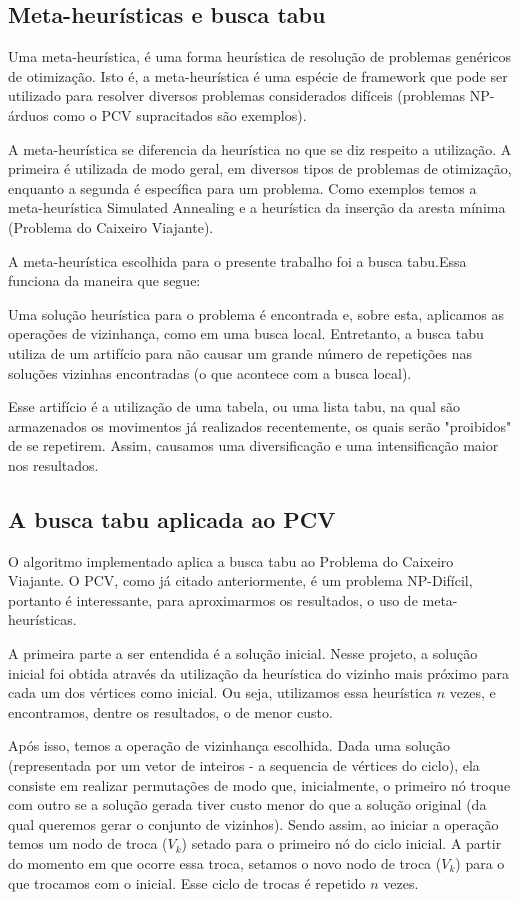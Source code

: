 \subsection{Meta-heurísticas e busca tabu}
Uma meta-heurística, é uma forma heurística de resolução de problemas genéricos de otimização\cite{metaheuristicas2009}. Isto é, a meta-heurística é uma espécie de framework que pode ser utilizado para resolver diversos problemas considerados difíceis (problemas NP-árduos como o PCV supracitados são exemplos).

A meta-heurística se diferencia da heurística no que se diz respeito a utilização. A primeira é utilizada de modo geral, em diversos tipos de problemas de otimização, enquanto a segunda é específica para um problema. Como exemplos temos a meta-heurística Simulated Annealing e a heurística da inserção da aresta mínima (Problema do Caixeiro Viajante).

A meta-heurística escolhida para o presente trabalho foi a busca tabu.Essa funciona da maneira que segue:

Uma solução heurística para o problema é encontrada e, sobre esta, aplicamos as operações de vizinhança, como em uma busca local. Entretanto, a busca tabu utiliza de um artifício para não causar um grande número de repetições nas soluções vizinhas encontradas (o que acontece com a busca local).

Esse artifício é a utilização de uma tabela, ou uma lista tabu, na qual são armazenados os movimentos já realizados recentemente, os quais serão "proibidos" de se repetirem. Assim, causamos uma diversificação e uma intensificação maior nos resultados.

\subsection{A busca tabu aplicada ao PCV}


O algoritmo implementado aplica a busca tabu ao Problema do Caixeiro Viajante. O PCV, como já citado anteriormente, é um problema NP-Difícil, portanto é interessante, para aproximarmos os resultados, o uso de meta-heurísticas.

A primeira parte a ser entendida é a solução inicial. Nesse projeto, a solução inicial foi obtida através da utilização da heurística do vizinho mais próximo para cada um dos vértices como inicial. Ou seja, utilizamos essa heurística $n$ vezes, e encontramos, dentre os resultados, o de menor custo.

Após isso, temos a operação de vizinhança escolhida. Dada uma solução (representada por um vetor de inteiros - a sequencia de vértices do ciclo), ela consiste em realizar permutações de modo que, inicialmente, o primeiro nó troque com outro se a solução gerada tiver custo menor do que a solução original (da qual queremos gerar o conjunto de vizinhos). Sendo assim, ao iniciar a operação temos um nodo de troca ($V_k$) setado para o primeiro nó do ciclo inicial. A partir do momento em que ocorre essa troca, setamos o novo nodo de troca ($V_k$) para o que trocamos com o inicial. Esse ciclo de trocas é repetido $n$ vezes.

